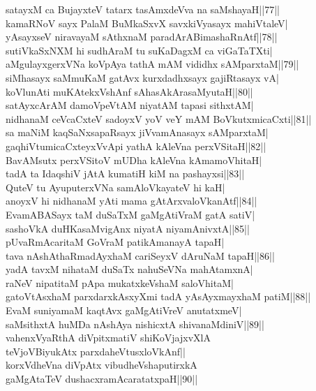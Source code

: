 \documentclass{article}
\begin{document}
satayxM ca BujayxteV tatarx tasAmxdeVva na saMshayaH||77||\\
kamaRNoV sayx PalaM BuMkaSxvX savxkiVyasayx mahiVtaleV|\\
yAsayxseV niravayaM sAthxnaM paradArABimashaRnAtf||78||\\
sutiVkaSxNXM hi sudhAraM tu suKaDagxM ca viGaTaTXti|\\
aMgulayxgerxVNa koVpAya tathA mAM vididhx sAMparxtaM||79||\\
siMhasayx saMmuKaM gatAvx kurxdadhxsayx gajiRtasayx vA|\\
koVlunAti muKAtekxVshAnf sAhasAkArasaMyutaH||80||\\
satAyxcArAM damoVpeVtAM niyatAM tapasi sithxtAM|\\
nidhanaM ceVcaCxteV sadoyxV yoV veY mAM BoVkutxmicaCxti||81||\\
sa maNiM kaqSaNxsapaRsayx jiVvamAnasayx sAMparxtaM|\\
gaqhiVtumicaCxteyxVvApi yathA kAleVna perxVSitaH||82||\\
BavAMsutx perxVSitoV mUDha kAleVna kAmamoVhitaH|\\
tadA ta IdaqshiV jAtA kumatiH kiM na pashayxsi||83||\\
QuteV tu AyuputerxVNa samAloVkayateV hi kaH|\\
anoyxV hi nidhanaM yAti mama gAtArxvaloVkanAtf||84||\\
EvamABASayx taM duSaTxM gaMgAtiVraM gatA satiV|\\
sashoVkA duHKasaMvigAnx niyatA niyamAnivxtA||85||\\
pUvaRmAcaritaM GoVraM patikAmanayA tapaH|\\
tava nAshAthaRmadAyxhaM cariSeyxV dAruNaM tapaH||86||\\
yadA tavxM nihataM duSaTx nahuSeVNa mahAtamxnA|\\
raNeV nipatitaM pApa mukatxkeVshaM saloVhitaM|\\
gatoVtAsxhaM parxdarxkAsxyXmi tadA yAsAyxmayxhaM patiM||88||\\
EvaM suniyamaM kaqtAvx gaMgAtiVreV anutatxmeV|\\
saMsithxtA huMDa nAshAya nishicxtA shivanaMdiniV||89||\\
vahenxVyaRthA diVpitxmatiV shiKoVjajxvXlA\\
teVjoVBiyukAtx parxdaheVtusxloVkAnf||\\
korxVdheVna diVpAtx vibudheVshaputirxkA\\
gaMgAtaTeV dushacxramAcaratatxpaH||90||\\
\end{document}
